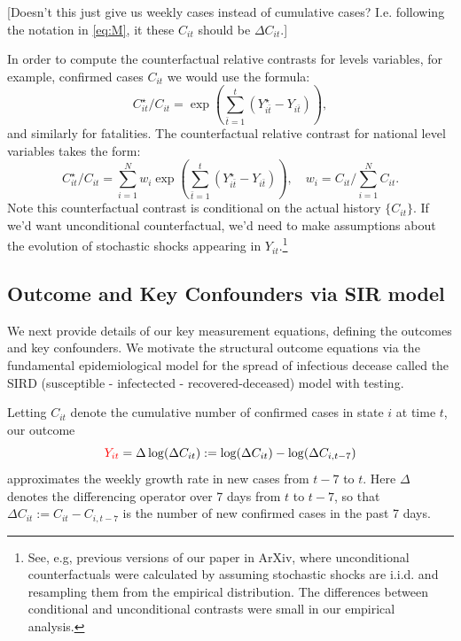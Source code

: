 \documentclass[11pt,reqno,letter]{amsart}
\theoremstyle{definition}
\def\ycolor{\color{red}}
\begin{document}
[Doesn't this just give us weekly cases instead of cumulative
cases? I.e. following the notation in \ref{eq:M}, it these $C_{it}$
should be $\Delta C_{it}$.]

In order to compute the counterfactual relative contrasts for levels
variables, for example, confirmed cases $C_{it}$
we would use the formula:
\begin{equation}
C^{\star}_{it}/C_{it} = \exp(  \sum_{\bar t=1}^t ( Y^\star_{i\bar t} -  Y_{i\bar t}) ),
\end{equation}
and similarly for fatalities. The counterfactual relative contrast for national level variables takes the form:
\begin{equation}
C^{\star}_{it}/C_{it} =  \sum_{i=1}^N w_i \exp(  \sum_{\bar t=1}^t (
Y^\star_{i\bar t} -  Y_{i\bar t}) ), \quad w_i = C_{it}/\sum_{i=1}^N
C_{it}.  \label{eqn:relative_national}
\end{equation}
Note this counterfactual contrast is conditional on the actual history $\{C_{it}\}$.  If we'd want unconditional counterfactual,
we'd need to make assumptions about the evolution of stochastic shocks appearing in $Y_{it}$.\footnote{See, e.g, previous
versions of our paper in ArXiv, where unconditional counterfactuals were calculated by assuming stochastic shocks
are i.i.d. and resampling them from the empirical distribution. The differences between conditional and unconditional
contrasts were small in our empirical analysis.}



\subsection{Outcome and Key Confounders via SIR model}\label{sec:sirmodel} We next provide details
of our key measurement equations, defining the outcomes and key confounders. We motivate the structural
outcome equations via the fundamental epidemiological model for the spread of infectious decease called
the SIRD (susceptible - infectected - recovered-deceased) model with testing.

Letting $C_{it}$ denote the cumulative number of  confirmed cases in state $i$ at time $t$, our outcome
\begin{equation} \label{eq:y}
{\ycolor Y_{it}} =\Delta \log(\Delta C_{it}):= \log( \Delta C_{it} ) -
\log( \Delta C_{i,t-7})
\end{equation}
approximates the weekly growth rate in new cases from $t-7$ to $t$. Here $\Delta$ denotes the differencing operator over 7 days from $t$ to $t-7$, so that $\Delta C_{it}:=C_{it}-C_{i,t-7}$ is the number of new confirmed cases in the past 7 days.
\end{document}
